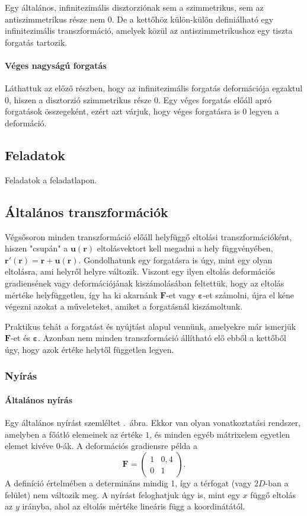 \documentclass[12pt,a4paper]{scrartcl}
\let\mathbf\bm
\begin{document}
Egy általános, infinitezimális disztorziónak sem a szimmetrikus, sem az antiszimmetrikus része nem 0. De a kettőhöz külön-külön definiálható egy infinitezimális transzformáció, amelyek közül az antiszimmetrikushoz egy tiszta forgatás tartozik.

\paragraph{Véges nagyságú forgatás}
Láthattuk az előző részben, hogy az infinitezimális forgatás deformációja egzaktul 0, hiszen a disztorzió szimmetrikus része 0. Egy véges forgatás előáll apró forgatások összegeként, ezért azt várjuk, hogy véges forgatásra is 0 legyen a deformáció.

\subsection{Feladatok}
Feladatok a feladatlapon.

\subsection{Általános transzformációk}
Végsősoron minden transzformáció előáll helyfüggő eltolási transzformációként, hiszen "csupán" a ${\mathbf{u}}\left( {\mathbf{r}} \right)$ eltolásvektort kell megadni a hely függvényében, ${\mathbf{r}}'\left( {\mathbf{r}} \right) = {\mathbf{r}} + {\mathbf{u}}\left( {\mathbf{r}} \right)$. Gondolhatunk egy forgatásra is úgy, mint egy olyan eltolásra, ami helyről helyre változik. Viszont egy ilyen eltolás deformációs gradiensének vagy deformációjának kiszámolásában feltettük, hogy az eltolás mértéke helyfüggetlen, így ha ki akarnánk ${\mathbf{F}}$-et vagy ${\mathbf{\varepsilon }}$-et számolni, újra el kéne végezni azokat a műveleteket, amiket a forgatásnál kiszámoltunk.

Praktikus tehát a forgatást és nyújtást alapul vennünk, amelyekre már ismerjük ${\mathbf{F}}$-et és ${\mathbf{\varepsilon }}$. Azonban nem minden transzformáció állítható elő ebből a kettőből úgy, hogy azok értéke helytől független legyen.

\subsubsection{Nyírás}
\paragraph{Általános nyírás}
Egy általános nyírást szemléltet \az{\ref{fig:nyiras}}.\ ábra. Ekkor van olyan vonatkoztatási rendszer, amelyben a főátló elemeinek az értéke $1$, és minden egyéb mátrixelem egyetlen elemet kivéve $0$-ák. A deformációs gradiensre példa a
\[{\mathbf{F}} = \left( {\begin{array}{*{20}{c}}
  1&{0,4} \\ 
  0&1 
\end{array}} \right).\]
A definíció értelmében a determináns mindig 1, így a térfogat (vagy $2D$-ban a felület) nem változik meg. A nyírást feloghatjuk úgy is, mint egy $x$ függő eltolás az $y$ irányba, ahol az eltolás mértéke lineáris függ a koordinátától.
\end{document}
